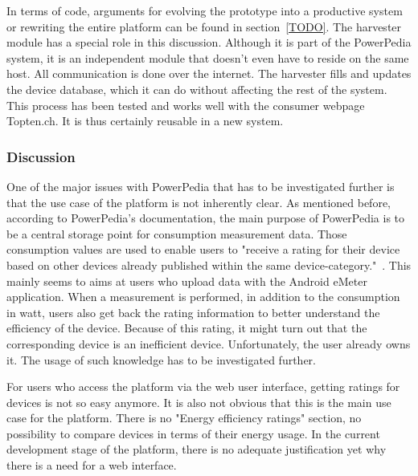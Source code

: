 In terms of code, arguments for evolving the prototype into a productive system or rewriting the entire platform can be found in section~\ref{TODO}. 
The harvester module has a special role in this discussion. Although it is part of the PowerPedia system, it is an independent module that doesn't even have to reside on the same host. All communication is done over the internet. The harvester fills and updates the device database, which it can do without affecting the rest of the system. This process has been tested and works well with the consumer webpage Topten.ch. It is thus certainly reusable in a new system.   

\subsubsection{Discussion}
One of the major issues with PowerPedia that has to be investigated further is that the use case of the platform is not inherently clear. As mentioned before, according to PowerPedia's documentation, the main purpose of PowerPedia is to be a central storage point for consumption measurement data. Those consumption values are used to enable users to "receive a rating for their device based on other devices already published within the same device-category."~\cite{merklepp}. This mainly seems to aims at users who upload data with the Android eMeter application. When a measurement is performed, in addition to the consumption in watt, users also get back the rating information to better understand the efficiency of the device. 
Because of this rating, it might turn out that the corresponding device is an inefficient device. Unfortunately, the user already owns it. The usage of such knowledge has to be investigated further.

For users who access the platform via the web user interface, getting ratings for devices is not so easy anymore. It is also not obvious that this is the main use case for the platform. There is no "Energy efficiency ratings" section, no possibility to compare devices in terms of their energy usage. 
In the current development stage of the platform, there is no adequate justification yet why there is a need for a web interface.


